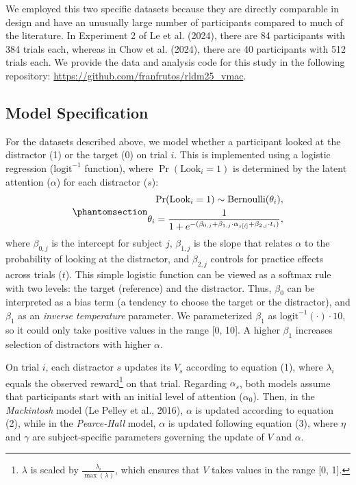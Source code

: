 \documentclass[11pt]{article}
\begin{document}
We employed this two specific datasets because they are directly
comparable in design and have an unusually large number of participants
compared to much of the literature. In Experiment 2 of Le et al. (2024),
there are 84 participants with 384 trials each, whereas in Chow et al.
(2024), there are 40 participants with 512 trials each. We provide the
data and analysis code for this study in the following repository:
\url{https://github.com/franfrutos/rldm25_vmac}.

\subsection{Model Specification}\label{model-specification}

For the datasets described above, we model whether a participant looked
at the distractor (1) or the target (0) on trial \(i\). This is
implemented using a logistic regression (\(\text{logit}^{-1}\)
function), where \(\operatorname{Pr}(\text{Look}_{i} = 1)\) is
determined by the latent attention (\(\alpha\)) for each distractor
(\(s\)): \begin{equation}\phantomsection\label{eq-4}{
\begin{aligned}
\operatorname{Pr}(\text{Look}_{i} = 1) \sim \text{Bernoulli}(\theta_{i}),\\
\theta_{i} = \frac{1}{1 + e^{-(\beta_{0,j} + \beta_{1,j} \cdot \alpha_{s[i]} + \beta_{2,j} \cdot t_{i})}},
\end{aligned}
}\end{equation} where \(\beta_{0,j}\) is the intercept for subject
\(j\), \(\beta_{1,j}\) is the slope that relates \(\alpha\) to the
probability of looking at the distractor, and \(\beta_{2,j}\) controls
for practice effects across trials (\(t\)). This simple logistic
function can be viewed as a softmax rule with two levels: the target
(reference) and the distractor. Thus, \(\beta_{0}\) can be interpreted
as a bias term (a tendency to choose the target or the distractor), and
\(\beta_{1}\) as an \emph{inverse temperature} parameter. We
parameterized \(\beta_{1}\) as \(\text{logit}^{-1}(\cdot)\cdot 10\), so
it could only take positive values in the range {[}0, 10{]}. A higher
\(\beta_{1}\) increases selection of distractors with higher \(\alpha\).

On trial \(i\), each distractor \(s\) updates its \(V_{s}\) according to
equation (1), where \(\lambda_{i}\) equals the observed
reward\footnote{\(\lambda\) is scaled by
  \(\frac{\lambda_{i}}{\max(\lambda)}\), which ensures that \(V\) takes
  values in the range {[}0, 1{]}.} on that trial. Regarding
\(\alpha_{s}\), both models assume that participants start with an
initial level of attention (\(\alpha_0\)). Then, in the
\emph{Mackintosh} model (Le Pelley et al., 2016), \(\alpha\) is updated
according to equation (2), while in the \emph{Pearce-Hall} model,
\(\alpha\) is updated following equation (3), where \(\eta\) and
\(\gamma\) are subject-specific parameters governing the update of \(V\)
and \(\alpha\).
\end{document}
